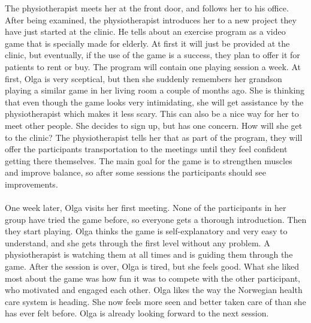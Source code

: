 The physiotherapist meets her at the front door, and follows her to his office. After being examined, the physiotherapist introduces her to a new project they have just started at the clinic. He tells about an exercise program as a video game that is specially made for elderly. At first it will just be provided at the clinic, but eventually, if the use of the game is a success, they plan to offer it for patients to rent or buy. The program will contain one playing session a week. At first, Olga is very sceptical, but then she suddenly remembers her grandson playing a similar game in her living room a couple of months ago. She is thinking that even though the game looks very intimidating, she will get assistance by the physiotherapist which makes it less scary. This can also be a nice way for her to meet other people. She decides to sign up, but has one concern. How will she get to the clinic? The physiotherapist tells her that as part of the program, they will offer the participants transportation to the meetings until they feel confident getting there themselves. The main goal for the game is to strengthen muscles and improve balance, so after some sessions the participants should see improvements. \\ \\
One week later, Olga visits her first meeting. None of the participants in her group have tried the game before, so everyone gets a thorough introduction. Then they start playing. Olga thinks the game is self-explanatory and very easy to understand, and she gets through the first level without any problem. A physiotherapist is watching them at all times and is guiding them through the game. After the session is over, Olga is tired, but she feels good. What she liked most about the game was how fun it was to compete with the other participant, who motivated and engaged each other. Olga likes the way the Norwegian health care system is heading. She now feels more seen and better taken care of than she has ever felt before. Olga is already looking forward to the next session.

